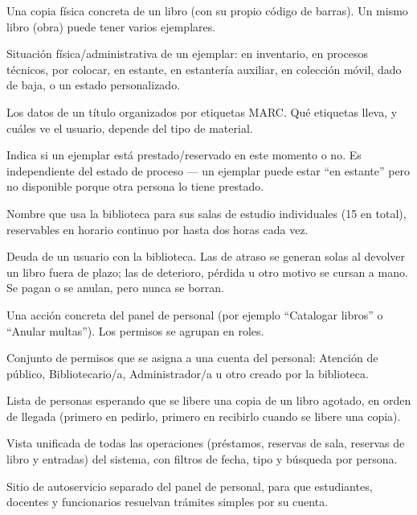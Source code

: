 \documentclass[11pt,a4paper]{report}
\begin{document}
\begin{description}[leftmargin=0pt,style=nextline]
  \item[Ejemplar] Una copia física concreta de un libro (con su propio
  código de barras). Un mismo libro (obra) puede tener varios ejemplares.

  \item[Estado de proceso] Situación física/administrativa de un
  ejemplar: en inventario, en procesos técnicos, por colocar, en
  estante, en estantería auxiliar, en colección móvil, dado de baja, o
  un estado personalizado.

  \item[Ficha bibliográfica] Los datos de un título organizados por
  etiquetas MARC. Qué etiquetas lleva, y cuáles ve el usuario, depende del
  tipo de material.

  \item[Disponible] Indica si un ejemplar está prestado/reservado en
  este momento o no. Es independiente del estado de proceso --- un
  ejemplar puede estar ``en estante'' pero no disponible porque otra
  persona lo tiene prestado.

  \item[Logia] Nombre que usa la biblioteca para sus salas de estudio
  individuales (15 en total), reservables en horario continuo por hasta
  dos horas cada vez.

  \item[Multa] Deuda de un usuario con la biblioteca. Las de atraso se
  generan solas al devolver un libro fuera de plazo; las de deterioro,
  pérdida u otro motivo se cursan a mano. Se pagan o se anulan, pero
  nunca se borran.

  \item[Permiso] Una acción concreta del panel de personal (por ejemplo
  ``Catalogar libros'' o ``Anular multas''). Los permisos se agrupan en
  roles.

  \item[Rol] Conjunto de permisos que se asigna a una cuenta del
  personal: Atención de público, Bibliotecario/a, Administrador/a u otro
  creado por la biblioteca.

  \item[Cola de espera] Lista de personas esperando que se libere una
  copia de un libro agotado, en orden de llegada (primero en pedirlo,
  primero en recibirlo cuando se libere una copia).

  \item[Registro Absoluto] Vista unificada de todas las operaciones
  (préstamos, reservas de sala, reservas de libro y entradas) del
  sistema, con filtros de fecha, tipo y búsqueda por persona.

  \item[Portal del Usuario] Sitio de autoservicio separado del panel de
  personal, para que estudiantes, docentes y funcionarios resuelvan
  trámites simples por su cuenta.
\end{description}
\end{document}
